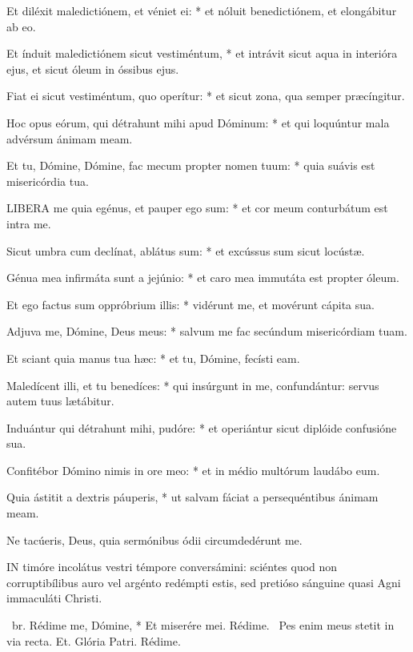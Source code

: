 Et diléxit maledictiónem, et véniet ei: * et nóluit benedictiónem, et elongábitur ab eo.

Et índuit maledictiónem sicut vestiméntum, * et intrávit sicut aqua in interióra ejus, et sicut óleum in óssibus ejus.

Fiat ei sicut vestiméntum, quo operítur: * et sicut zona, qua semper præcíngitur.

Hoc opus eórum, qui détrahunt mihi apud Dóminum: * et qui loquúntur mala advérsum ánimam meam.

Et tu, Dómine, Dómine, fac mecum propter nomen tuum: * quia suávis est misericórdia tua.


\lettrine[lines=2]{L}{IBERA} me quia egénus, et pauper ego sum: * et cor meum conturbátum est intra me.

Sicut umbra cum declínat, ablátus sum: * et excússus sum sicut locústæ.

Génua mea infirmáta sunt a jejúnio: * et caro mea immutáta est propter óleum.

Et ego factus sum oppróbrium illis: * vidérunt me, et movérunt cápita sua.

Adjuva me, Dómine, Deus meus: * salvum me fac secúndum misericórdiam tuam.

Et sciant quia manus tua hæc: * et tu, Dómine, fecísti eam.

Maledícent illi, et tu benedíces: * qui insúrgunt in me, confundántur: servus autem tuus lætábitur.

Induántur qui détrahunt mihi, pudóre: * et operiántur sicut diplóide confusióne sua.

Confitébor Dómino nimis in ore meo: * et in médio multórum laudábo eum.

Quia ástitit a dextris páuperis, * ut salvam fáciat a persequéntibus ánimam meam.

 Ne tacúeris, Deus, quia sermónibus ódii circumdedérunt me.



\lettrine[lines=2]{I}{N} timóre incolátus vestri témpore conversámini: sciéntes quod non corruptibílibus auro vel argénto redémpti estis, sed pretióso sánguine quasi Agni immaculáti Christi.

\R\ br. Rédime me, Dómine, * Et miserére mei. Rédime. \V\ Pes enim meus stetit in via recta. Et. Glória Patri. Rédime.

